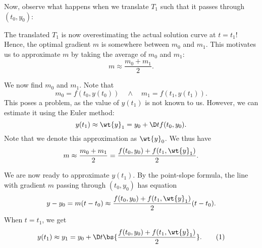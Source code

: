 Now, observe what happens when we translate $T_1$ such that it passes through $(t_0, y_0)$:

\begin{figure}[H]
    \centering
    \caption{}
\end{figure}

The translated $T_1$ is now overestimating the actual solution curve at $t = t_1$! Hence, the optimal gradient $m$ is somewhere between $m_0$ and $m_1$. This motivates us to approximate $m$ by taking the average of $m_0$ and $m_1$: \[m \approx \frac{m_0 + m_1}{2}.\]

We now find $m_0$ and $m_1$. Note that \[m_0 = f(t_0, y(t_0)) \quad \land \quad m_1 = f(t_1, y(t_1)).\] This poses a problem, as the value of $y(t_1)$ is not known to us. However, we can estimate it using the Euler method: \[y(t_1) \approx \wt{y}_1 = y_0 + \D t f(t_0, y_0).\] Note that we denote this approximation as $\wt{y}_0$. We thus have \[m \approx \frac{m_0 + m_1}{2} = \frac{f(t_0, y_0) + f(t_1, \wt{y}_1)}{2}.\]

We are now ready to approximate $y(t_1)$. By the point-slope formula, the line with gradient $m$ passing through $(t_0, y_0)$ has equation \[y - y_0 = m (t - t_0) \approx \frac{f(t_0, y_0) + f(t_1, \wt{y}_1)}{2} (t - t_0).\] When $t = t_1$, we get \[y(t_1) \approx y_1 = y_0 + \D t \bs{\frac{f(t_0, y_0) + f(t_1, \wt{y}_1)}{2}}. \tag{1}\]

